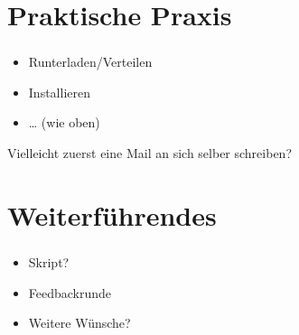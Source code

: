 \documentclass[compress]{beamer}
\begin{document}
\section{Praktische Praxis}
\label{sec-1-1-6}

\begin{frame}
  \frametitle{\insertsection}
  \begin{itemize}
  \item Runterladen/Verteilen
  \item Installieren
  \item \ldots{} (wie oben)
  \end{itemize}
  Vielleicht zuerst eine Mail an sich selber schreiben?
\end{frame}

\section{Weiterführendes}
\label{sec-1-1-7}

\begin{frame}
  \frametitle{\insertsection}
  \begin{itemize}
  \item Skript?
  \item Feedbackrunde
  \item Weitere Wünsche?
  \end{itemize}
\end{frame}
\end{document}

